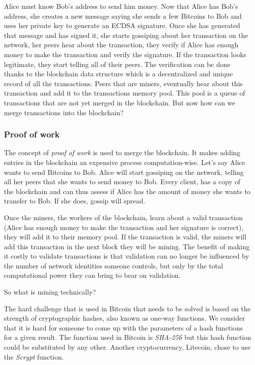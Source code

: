 \documentclass{vldb}
\begin{document}
Alice must know Bob's address to send him money. Now that Alice has Bob's address, she creates a new message saying she sends a few Bitcoins to Bob and uses her private key to generate an ECDSA signature. Once she has generated that message and has signed it, she starts gossiping about her transaction on the network, her peers hear about the transaction, they verify if Alice has enough money to make the transaction and verify the signature. If the transaction looks legitimate, they start telling all of their peers. The verification can be done thanks to the blockchain data structure which is a decentralized and unique record of all the transactions. Peers that are miners, eventually hear about this transaction and add it to the transactions memory pool. This pool is a queue of transactions that are not yet merged in the blockchain. But now how can we merge transactions into the blockchain? 

\subsubsection{Proof of work}

The concept of \emph{proof of work} is used to merge the blockchain. It makes adding entries in the blockchain an expensive process computation-wise. Let's say Alice wants to send Bitcoins to Bob. Alice will start gossiping on the network, telling all her peers that she wants to send money to Bob. Every client, has a copy of the blockchain and can thus assess if Alice has the amount of money she wants to transfer to Bob. If she does, gossip will spread.

Once the miners, the workers of the blockchain, learn about a valid transaction (Alice has enough money to make the transaction and her signature is correct), they will add it to their memory pool. If the transaction is valid, the miners will add this transaction in the next block they will be mining. The benefit of making it costly to validate transactions is that validation can no longer be influenced by the number of network identities someone controls, but only by the total computational power they can bring to bear on validation.

So what is mining technically?

The hard challenge that is used in Bitcoin that needs to be solved is based on the strength of cryptographic hashes, also known as one-way functions. We consider that it is hard for someone to come up with the parameters of a hash functions for a given result. The function used in Bitcoin is \emph{SHA-256} but this hash function could be substituted by any other. Another cryptocurrency, Litecoin, chose to use the \emph{Scrypt} function.
\end{document}

